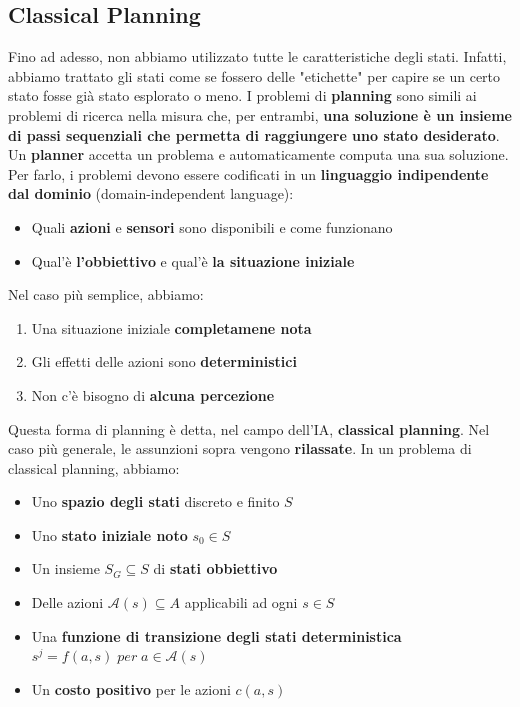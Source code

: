 \documentclass[12pt]{article}
\begin{document}
\subsection{Classical Planning}
Fino ad adesso, non abbiamo utilizzato tutte le caratteristiche degli stati. Infatti, abbiamo trattato
gli stati come se fossero delle "etichette" per capire se un certo stato fosse già stato esplorato o meno.
I problemi di \textbf{planning} sono simili ai problemi di ricerca nella misura che, per entrambi, \textbf{una soluzione è un insieme di passi sequenziali che permetta di raggiungere uno stato desiderato}.
Un \textbf{planner} accetta un problema e automaticamente computa una sua soluzione. Per farlo, i problemi devono essere codificati in un \textbf{linguaggio indipendente dal dominio} (domain-independent language):
\begin{itemize}
    \item Quali \textbf{azioni} e \textbf{sensori} sono disponibili e come funzionano
    \item Qual'è \textbf{l'obbiettivo} e qual'è \textbf{la situazione iniziale}
\end{itemize}
Nel caso più semplice, abbiamo:
\begin{enumerate}
    \item Una situazione iniziale \textbf{completamene nota}
    \item Gli effetti delle azioni sono \textbf{deterministici}
    \item Non c'è bisogno di \textbf{alcuna percezione}
\end{enumerate}
Questa forma di planning è detta, nel campo dell'IA, \textbf{classical planning}.
Nel caso più generale, le assunzioni sopra vengono \textbf{rilassate}.
In un problema di classical planning, abbiamo:
\begin{itemize}
    \item Uno \textbf{spazio degli stati} discreto e finito $S$
    \item Uno \textbf{stato iniziale noto} $s_0 \in S$
    \item Un insieme $S_G \subseteq S$ di \textbf{stati obbiettivo}
    \item Delle azioni $\mathcal{A}(s) \subseteq A$ applicabili ad ogni $s \in S$
    \item Una \textbf{funzione di transizione degli stati deterministica} $s^j = f(a,s) \; per \; a \in \mathcal{A}(s)$
    \item Un \textbf{costo positivo} per le azioni $c(a, s)$
\end{itemize}
\end{document}
